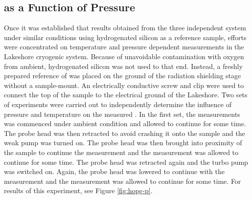 \subsection{\cpd{} as a Function of Pressure}
Once it was established that results obtained from the three independent system under similar conditions using hydrogenated silicon as a reference sample, efforts were concentrated on temperature and pressure dependent measurements in the Lakeshore cryogenic system. Because of unavoidable contamination with oxygen from ambient, hydrogenated silicon was not used to that end. Instead, a freshly prepared reference of \hopg{} was placed on the ground of the radiation shielding stage without a sample-mount. An electrically conductive screw and clip were used to connect the top of the \hopg{} sample to the electrical ground of the Lakeshore. Two sets of experiments were carried out to independently determine the influence of pressure and temperature on the measured \cpd{}. In the first set, the measurements was commenced under ambient condition and allowed to continue for some time. The probe head was then retracted to avoid crashing it onto the sample and the weak pump was turned on. The probe head was then brought into proximity of the sample to continue the measurement and the measurement was allowed to continue for some time. The probe head was retracted again and the turbo pump was switched on. Again, the probe head was lowered to continue with the measurement and the measurement was allowed to continue for some time. For results of this experiment, see Figure \ref{fig:hopg-p}.
